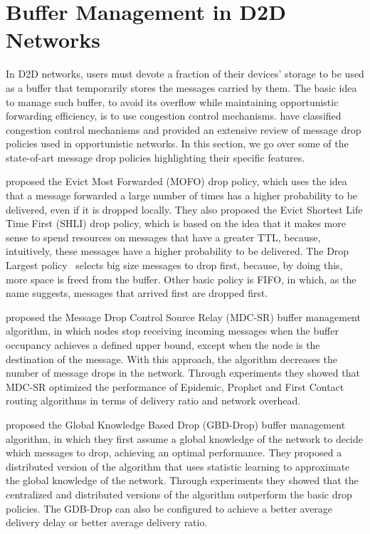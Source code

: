 \section{Buffer Management in D2D Networks}

In D2D networks, users must devote a fraction of their devices’ storage to be used as a buffer that temporarily stores the messages carried by them.
The basic idea to manage such buffer, to avoid its overflow while maintaining opportunistic forwarding efficiency, is to use congestion control mechanisms.
\cite{silva2015survey} have classified congestion control mechanisms and provided an extensive review of message drop policies used in opportunistic networks.
In this section, we go over some of the state-of-art message drop policies highlighting their specific features.

\cite{lindgren2006evaluation} proposed the Evict Most Forwarded (MOFO) drop policy, which uses the idea that a message forwarded a large number
of times has a higher probability to be delivered, even if it is dropped locally. They also proposed the Evict Shortest Life Time First (SHLI) drop policy, which
is based on the idea that it makes more sense to spend resources on messages that have a greater TTL, because, intuitively, these messages have a higher probability
to be delivered. The Drop Largest policy~\cite{rashid2010efficient} selects big size messages to drop first, because, by doing this, more space is freed from the buffer.
Other basic policy is FIFO, in which, as the name suggests, messages that arrived first are dropped first.

\cite{rashid2013message} proposed the Message Drop Control Source Relay (MDC-SR) buffer management algorithm, in which nodes stop receiving incoming messages
when the buffer occupancy achieves a defined upper bound, except when the node is the destination of the message. With this approach, the algorithm decreases the number of message
drops in the network. Through experiments they showed that MDC-SR optimized the performance of Epidemic, Prophet and First Contact routing algorithms in terms of delivery ratio and
network overhead.

\cite{krifa2008optimal} proposed the Global Knowledge Based Drop (GBD-Drop) buffer management algorithm, in which they first assume a global knowledge of the network
to decide which messages to drop, achieving an optimal performance. They proposed a distributed version of the algorithm that uses statistic learning to approximate the global knowledge
of the network. Through experiments they showed that the centralized and distributed versions of the algorithm outperform the basic drop policies. The GDB-Drop can also be configured
to achieve a better average delivery delay or better average delivery ratio.

